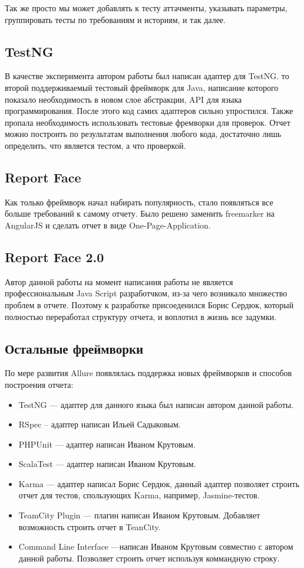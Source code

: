Так же просто мы может добавлять к тесту аттачменты, указывать параметры, группировать тесты по требованиям и историям, и так далее.

\subsection{TestNG}

В качестве эксперимента автором работы был написан адаптер для TestNG. то второй поддерживаемый тестовый фреймворк для Java, написание которого показало необходимость в новом слое абстракции, API для языка программирования. После этого код самих адаптеров сильно упростился. Также пропала необходимость использовать тестовые фремворки для проверок. Отчет можно построить по результатам выполнения любого кода, достаточно лишь определить, что является тестом, а что проверкой.

\subsection{Report Face}

Как только фреймворк начал набирать популярность, стало появляться все больше требований к самому отчету. Было решено заменить freemarker на AngularJS и сделать отчет в виде One-Page-Application. 

\subsection{Report Face 2.0}

Автор данной работы на момент написания работы не является профессиональным Java Script разработчком, из-за чего возникало множество проблем в отчете. Поэтому к разработке присоеденился Борис Сердюк, который полностью переработал структуру отчета, и воплотил в жизнь все задумки.

\subsection{Остальные фреймворки}

По мере развития Allure появлялась поддержка новых фреймворков и способов построения отчета:

\begin{itemize}
\item TestNG --- адаптер для данного языка был написан автором данной работы.
\item RSpec -- адаптер написан Ильей Садыковым.
\item PHPUnit --- адаптер написан Иваном Крутовым.
\item ScalaTest --- адаптер написан Иваном Крутовым.
\item Karma --- адаптер написал Борис Сердюк, данный адаптер позволяет строить отчет для тестов, спользующих Karma, например, Jasmine-тестов.
\item TeamCity Plugin --- плагин написан Иваном Крутовым. Добавляет возможность строить отчет в TeanCity.
\item Command Line Interface ---написан Иваном Крутовым совместно с автором данной работы. Позволяет строить отчет используя коммандную строку.
\end{itemize}

